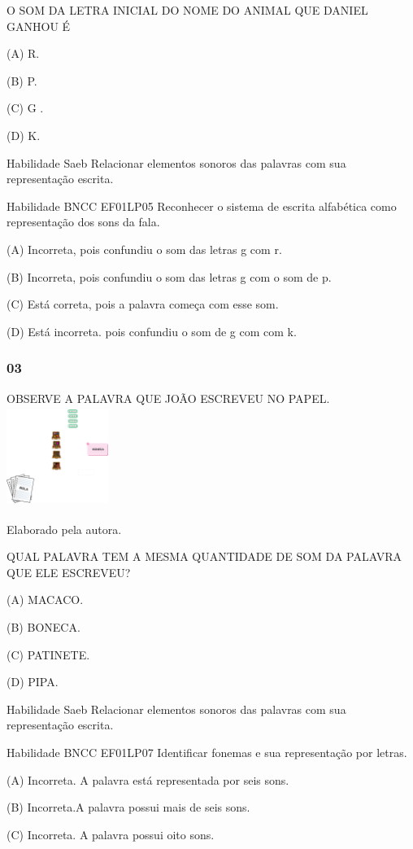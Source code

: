 O SOM DA LETRA INICIAL DO NOME DO ANIMAL QUE DANIEL GANHOU É

(A) R.

(B) P.

(C) G .

(D) K.

Habilidade Saeb Relacionar elementos sonoros das palavras com sua
representação escrita.

Habilidade BNCC EF01LP05 Reconhecer o sistema de escrita alfabética como
representação dos sons da fala.

(A) Incorreta, pois confundiu o som das letras g com r.

(B) Incorreta, pois confundiu o som das letras g com o som de p.

(C) Está correta, pois a palavra começa com esse som.

(D) Está incorreta. pois confundiu o som de g com com k.

\subsubsection{03}\label{section-28}

OBSERVE A PALAVRA QUE JOÃO ESCREVEU NO
PAPEL.\includegraphics[width=1.29792in,height=1.27986in]{media/image188.png}

Elaborado pela autora.

QUAL PALAVRA TEM A MESMA QUANTIDADE DE SOM DA PALAVRA QUE ELE ESCREVEU?

(A) MACACO.

(B) BONECA.

(C) PATINETE.

(D) PIPA.

Habilidade Saeb Relacionar elementos sonoros das palavras com sua
representação escrita.

Habilidade BNCC EF01LP07 Identificar fonemas e sua representação por
letras.

(A) Incorreta. A palavra está representada por seis sons.

(B) Incorreta.A palavra possui mais de seis sons.

(C) Incorreta. A palavra possui oito sons.

